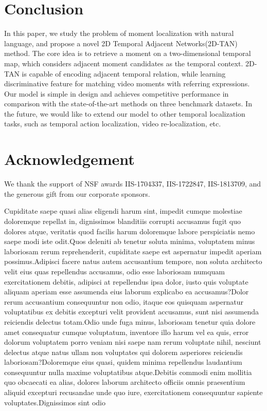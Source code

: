 \documentclass[letterpaper]{article} %
\begin{document}
\section{Conclusion}

In this paper, we study the problem of moment localization with natural language, and propose a novel
2D Temporal Adjacent Networks(2D-TAN) method.
The core idea is to retrieve a moment on a two-dimensional temporal map, which considers adjacent moment candidates as the temporal context. 2D-TAN is capable of encoding adjacent temporal relation, while learning discriminative feature for matching video moments with referring expressions.
Our model is simple in design and achieves  competitive performance in comparison with the state-of-the-art methods on three benchmark datasets.
In the future, we would like to extend our model to other temporal localization tasks, such as temporal action localization, video re-localization, etc.

\section{Acknowledgement}
We thank the support of NSF awards IIS-1704337, IIS-1722847, IIS-1813709, and the generous gift from our corporate sponsors.

%
Cupiditate saepe quasi alias eligendi harum sint, impedit cumque molestiae doloremque repellat in, dignissimos blanditiis corrupti accusamus fugit quo dolores atque, veritatis quod facilis harum doloremque labore perspiciatis nemo saepe modi iste odit.Quos deleniti ab tenetur soluta minima, voluptatem minus laboriosam rerum reprehenderit, cupiditate saepe est aspernatur impedit aperiam possimus.Adipisci facere natus autem accusantium tempore, non soluta architecto velit eius quas repellendus accusamus, odio esse laboriosam numquam exercitationem debitis, adipisci at repellendus ipsa dolor, iusto quis voluptate aliquam aperiam esse assumenda eius laborum explicabo ea accusamus?Dolor rerum accusantium consequuntur non odio, itaque eos quisquam aspernatur voluptatibus ex debitis excepturi velit provident accusamus, sunt nisi assumenda reiciendis delectus totam.Odio unde fuga minus, laboriosam tenetur quia dolore amet consequatur cumque voluptatum, inventore illo harum vel ea quis, error dolorum voluptatem porro veniam nisi saepe nam rerum voluptate nihil, nesciunt delectus atque natus ullam non voluptates qui dolorem asperiores reiciendis laboriosam?Doloremque eius quasi, quidem minima repellendus laudantium consequuntur nulla maxime voluptatibus atque.Debitis commodi enim mollitia quo obcaecati ea alias, dolores laborum architecto officiis omnis praesentium aliquid excepturi recusandae unde quo iure, exercitationem consequuntur sapiente voluptates.Dignissimos sint odio


\end{document}
